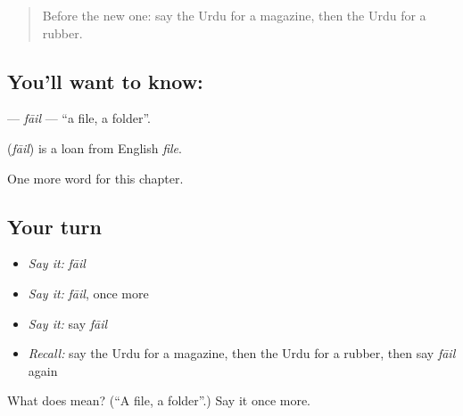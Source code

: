 \label{lesson:UR-C225-fail}



\begin{quote}
Before the new one: say the Urdu for a magazine, then the Urdu for a rubber.
\end{quote}

\subsection*{You'll want to know: }
\textbf{} — \emph{fāil} — \textquotedblleft{}a file, a folder\textquotedblright{}.

\begin{cousinweb}
\textbf{} (\emph{fāil}) is a loan from English \emph{file}.
\end{cousinweb}

\begin{grammarlens}[title={What you've built}]
One more word for this chapter.
\end{grammarlens}

\subsection*{Your turn}
\begin{itemize}
\raggedright
  \item \emph{Say it:} \emph{fāil}
  \item \emph{Say it:} \emph{fāil}, once more
  \item \emph{Say it:} say \emph{fāil}
  \item \emph{Recall:} say the Urdu for a magazine, then the Urdu for a rubber, then say \emph{fāil} again
\end{itemize}

\begin{tcolorbox}[breakable,colback=teal!4,colframe=teal!35!black,title={Before you move on}]
What does  mean? (\textquotedblleft{}A file, a folder\textquotedblright{}.) Say it once more.
\end{tcolorbox}
